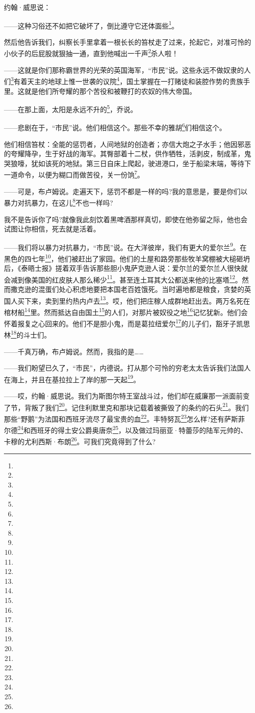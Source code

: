 \par 约翰·威思说：
\par ——这种习俗还不如把它破坏了，倒比遵守它还体面些\footnote{}。
\par 然后他告诉我们，纠察长手里拿着一根长长的笞杖走了过来，抡起它，对准可怜的小伙子的后屁股就狠抽一通，直到他喊出一千声\footnote{}杀人啦！
\par ——这就是你们那称霸世界的光荣的英国海军，“市民”说。这些永远不做奴隶的人们\footnote{}有着天主的地球上惟一世袭的议院\footnote{}，国土掌握在一打赌徒和装腔作势的贵族手里。这就是他们所夸耀的那个苦役和被鞭打的农奴的伟大帝国。
\par ——在那上面，太阳是永远不升的\footnote{}，乔说。
\par ——悲剧在于，“市民”说。他们相信这个。那些不幸的雅胡\footnote{}们相信这个。
\par 他们相信笞杖：全能的惩罚者，人间地狱的创造者；亦信大炮之子水手；他因邪恶的夸耀降孕，生于好战的海军。其臀部着十二杖，供作牺牲，活剥皮，制成革，鬼哭狼嚎，犹如该死的地狱。第三日自床上爬起，驶进港口，坐于船梁末端，等待下一道命令，以便为糊口而做苦役，关一份饷\footnote{}。
\par ——可是，布卢姆说。走遍天下，惩罚不都是一样的吗?我的意思是，要是你们以暴力对抗暴力，在这儿\footnote{}不也一样吗?
\par 我不是告诉你了吗?就像我此刻饮着黑啤酒那样真切，即使在他弥留之际，他也会试图让你相信，死去就是活着。
\par ——我们将以暴力对抗暴力，“市民”说。在大洋彼岸，我们有更大的爱尔兰\footnote{}。在黑色的四七年\footnote{}，他们被赶出了家园。他们的土屋和路旁那些牧羊窝棚被大槌砸坍后，《泰晤士报》搓着双手告诉那些胆小鬼萨克逊人说：爱尔兰的爱尔兰人很快就会减到像美国的红皮肤人那么稀少\footnote{}。甚至连土耳其大公都送来他的比塞塔\footnote{}。然而撒克逊的混蛋们处心积虑地要把本国老百姓饿死。当时遍地都是粮食，贪婪的英国人买下来，卖到里约热内卢去\footnote{}。哎，他们把庄稼人成群地赶出去。两万名死在棺材船\footnote{}里。然而抵达自由国土\footnote{}的人们，对那片被奴役之地\footnote{}记忆犹新。他们会怀着报复之心回来的。他们不是胆小鬼，而是葛拉纽爱尔\footnote{}的儿子们，豁牙子凯思林\footnote{}的斗士们。
\par ——千真万确，布卢姆说。然而，我指的是……
\par ——我们盼望已久了，“市民”，内德说。打从那个可怜的穷老太太告诉我们法国人在海上，并且在基拉拉上了岸的那一天起\footnote{}。
\par ——哎，约翰·威思说。我们为斯图尔特王室战斗过，他们却在威廉那一派面前变了节，背叛了我们\footnote{}。记住利默里克和那块记载着被撕毁了的条约的石头\footnote{}。我们那些“野鹅”为法国和西班牙流尽了最宝贵的血\footnote{}。丰特努瓦\footnote{}怎么样?还有萨斯菲尔德\footnote{}和西班牙的得土安公爵奥唐奈\footnote{}，以及做过玛丽亚·特蕾莎的陆军元帅的、卡穆的尤利西斯·布朗\footnote{}。可我们究竟得到了什么?
